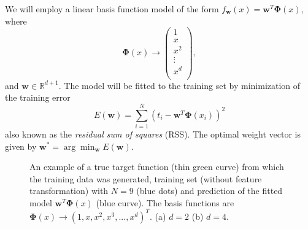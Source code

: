 \documentclass[a4]{article}
\begin{document}
We will employ a linear basis function model of the form $f_{\mathbf w}(x) = {\mathbf w}^T{\mathbf \Phi}(x)$, where\begin{equation} \nonumber
{\mathbf \Phi}(x) \rightarrow \left(
\begin{array}{c} 1\\ x \\ x^2 \\ \vdots \\ x^d \\ \end{array}\right),
\end{equation} 
and ${\mathbf w} \in \mathbb{R}^{d+1}$. The model will be fitted to the training set by minimization of the training error 
\begin{equation}
E({\mathbf w}) = \sum_{i = 1}^N(t_i - {\mathbf w}^T{\mathbf \Phi}(x_i))^2
\end{equation} 
also known as the \emph{residual sum of squares} (RSS). The optimal weight vector is given by ${\mathbf w}^* = \arg\min_{\mathbf w} E({\mathbf w})$.


\begin{figure}[!h]
\begin{center}
\centering
\end{center}
\caption{An example of a true target function (thin green curve) from which the training data was generated, training set (without feature transformation) with $N=9$ (blue dots) and prediction of the fitted model ${\mathbf w}^T{\mathbf \Phi}(x)$ (blue curve). The basis functions are ${\mathbf \Phi}(x) \rightarrow (1,x,x^2,x^3,...,x^d)^T$. (a) $d=2$ (b) $d=4$.}
\end{figure}
\end{document}
